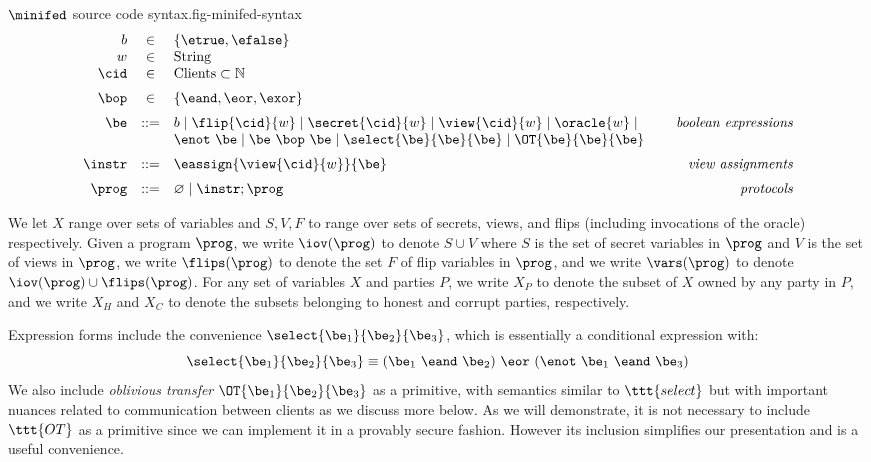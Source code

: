 \begin{fpfig}[t]{$\minifed$ source code syntax.}{fig-minifed-syntax}
$$
\begin{array}{rcl@{\hspace{8mm}}r}
b &\in& \{ \etrue, \efalse \} \\
w &\in& \mathrm{String} \\ 
\cid &\in& \mathrm{Clients} \subset  \mathbb{N} \\[2mm]%
\bop &\in& \{ \eand, \eor, \exor \} \\[2mm]
\be &::=& b \mid \flip{\cid}{w} \mid \secret{\cid}{w} \mid \view{\cid}{w} \mid \oracle{w} \mid & \textit{boolean expressions}\\
& &  \enot\ \be \mid \be\ \bop\ \be \mid \select{\be}{\be}{\be} \mid \OT{\be}{\be}{\be} \\[2mm]
\instr &::=& \eassign{\view{\cid}{w}}{\be} & \textit{view assignments} \\[2mm]
\prog &::=& \varnothing \mid \instr; \prog & \textit{protocols}
\end{array}
$$ 
\end{fpfig}

We let $X$ range over sets of variables and $S,V,F$ to range over sets
of secrets, views, and flips (including invocations of the oracle)
respectively. Given a program $\prog$, we write $\iov(\prog)$ to
denote $S \cup V$ where $S$ is the set of secret variables in $\prog$
and $V$ is the set of views in $\prog$, we write $\flips(\prog)$
to denote the set $F$ of flip variables in $\prog$, and we
write $\vars(\prog)$ to denote $\iov(\prog) \cup \flips(\prog)$. For any set of
variables $X$ and parties $P$, we write $X_P$ to denote the subset of
$X$ owned by any party in $P$, and we write $X_H$ and $X_C$ to denote
the subsets belonging to honest and corrupt parties, respectively.

Expression forms include the convenience
$\select{\be_1}{\be_2}{\be_3}$, which is essentially a conditional
expression with:
$$
\select{\be_1}{\be_2}{\be_3} \equiv (\be_1\ \eand\ \be_2)\ \eor\ (\enot\ \be_1\ \eand\ \be_3)
$$
We also include \emph{oblivious transfer} $\OT{\be_1}{\be_2}{\be_3}$ as a primitive,
with semantics similar to $\ttt{select}$ but with important nuances
related to communication between clients as we discuss more below.
As we will demonstrate, it is not necessary to include $\ttt{OT}$
as a primitive since we can implement it in a provably secure
fashion. However its inclusion simplifies our presentation and is a useful
convenience.

